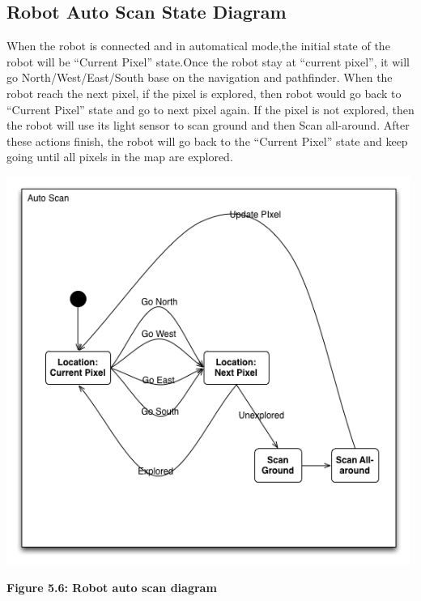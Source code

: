 \documentclass[11pt, a4paper]{report}
\begin{document}
\subsection{ Robot Auto Scan State Diagram}
When the robot is connected and in automatical mode,the initial state of the robot will be ``Current Pixel'' state.Once the robot stay at ``current pixel'', it will go North/West/East/South base on the navigation and pathfinder. When the robot reach the next pixel, if the pixel is explored, then robot would go back to ``Current Pixel'' state and go to next pixel again. If the pixel is not explored, then the robot will use its light sensor to scan ground and then Scan all-around. After these actions finish, the robot will go back to the ``Current Pixel'' state and keep going until all pixels in the map are explored.
 \begin{center}
 \includegraphics[width=13.20cm]{AutoScan.png}
\end{center}
\begin{center}
\textbf {Figure 5.6:  Robot auto scan diagram} \\[0.3cm]
\end{center}
\pagebreak
\end{document}
